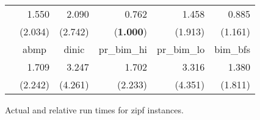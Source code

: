 \documentclass{article}
\begin{document}
\begin{figure}[ht]
\begin{center}
\begin{scriptsize}
\begin{tabular}{||c|r|r|r|r|r||}
    &   1.550   &   2.090   &   0.762   &   1.458   &   0.885   \\
    &   (2.034) &   (2.742) &   ({\bf 1.000})   &   (1.913) &   (1.161) \\  \cline{2-6}
    &   \multicolumn{1}{|c|}{{\sf abmp}}    &   \multicolumn{1}{|c|}{{\sf dinic}}   &   \multicolumn{1}{|c|}{{\sf pr\_bim\_hi}} &   \multicolumn{1}{|c|}{{\sf pr\_bim\_lo}} &   \multicolumn{1}{|c||}{{\sf bim\_bfs}}   \\  \cline{2-6}
    &   1.709   &   3.247   &   1.702   &   3.316   &   1.380   \\
    &   (2.242) &   (4.261) &   (2.233) &   (4.351) &   (1.811) \\  \hline
\hline
\end{tabular}
\end{scriptsize}
\caption{\label{Figure:zipfscaling} Actual and relative run times for {\sf zipf} instances.}
\end{center}
\end{figure}
\end{document}
